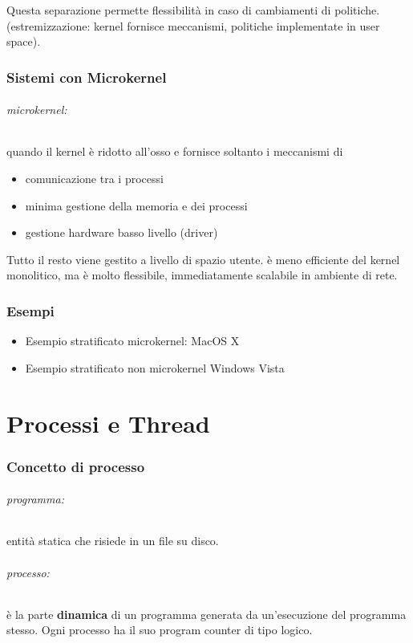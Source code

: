 \documentclass{article}
\begin{document}
Questa separazione permette flessibilità in caso di cambiamenti di politiche. (estremizzazione: kernel fornisce meccanismi, politiche implementate in user space).


\section{Sistemi con Microkernel}
\paragraph{microkernel:} quando il kernel è ridotto all'osso e fornisce soltanto i meccanismi di 
\begin{itemize}
    \item comunicazione tra i processi
    \item minima gestione della memoria e dei processi
    \item gestione hardware basso livello (driver)
\end{itemize}
Tutto il resto viene gestito a livello di spazio utente. è meno efficiente del kernel monolitico, ma è molto flessibile, 
immediatamente scalabile in ambiente di rete.

\section{Esempi}
\begin{itemize}
    \item Esempio stratificato microkernel: MacOS X
    \item Esempio stratificato non microkernel Windows Vista
\end{itemize}


\part{Processi e Thread} %
\section{Concetto di processo}
\paragraph{programma:} entità statica che risiede in un file su disco.
\paragraph{processo:} è la parte \textbf{dinamica} di un programma generata da un'esecuzione del programma stesso. Ogni processo ha il suo program counter di tipo logico.
\end{document}
